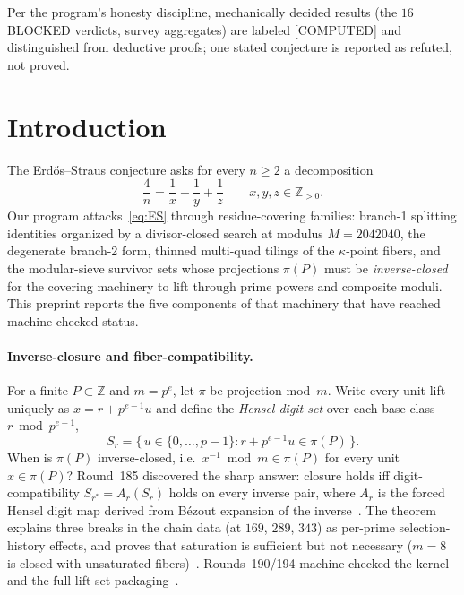 \documentclass[11pt,a4paper]{article}
\theoremstyle{definition}
\begin{document}
Per the program's honesty discipline, mechanically decided results (the
$16$ BLOCKED verdicts, survey aggregates) are labeled [COMPUTED] and
distinguished from deductive proofs; one stated conjecture is reported
as refuted, not proved.

\section{Introduction}

The Erd\H{o}s--Straus conjecture asks for every $n\ge2$ a decomposition
\begin{equation}
  \label{eq:ES}
  \frac{4}{n}=\frac1x+\frac1y+\frac1z\qquad x,y,z\in\mathbb{Z}_{>0}.
\end{equation}
Our program attacks~\eqref{eq:ES} through residue-covering families:
branch-1 splitting identities organized by a divisor-closed search at
modulus $M=2042040$, the degenerate branch-2 form, thinned multi-quad
tilings of the $\kappa$-point fibers, and the modular-sieve survivor
sets whose projections $\pi(P)$ must be \emph{inverse-closed} for the
covering machinery to lift through prime powers and composite moduli.
This preprint reports the five components of that machinery that have
reached machine-checked status.

\paragraph{Inverse-closure and fiber-compatibility.}
For a finite $P\subset\mathbb{Z}$ and $m=p^e$, let $\pi$ be projection
mod~$m$. Write every unit lift uniquely as $x=r+p^{e-1}u$ and define the
\emph{Hensel digit set} over each base class $r\bmod p^{e-1}$,
\begin{equation}
  \label{eq:digset}
  S_r=\{\,u\in\{0,\dots,p-1\}:r+p^{e-1}u\in\pi(P)\,\}.
\end{equation}
When is $\pi(P)$ inverse-closed, i.e.\ $x^{-1}\bmod m\in\pi(P)$ for every
unit $x\in\pi(P)$? Round~185 discovered the sharp answer: closure holds
iff digit-compatibility $S_{r^*}=A_r(S_r)$ holds on every inverse pair,
where $A_r$ is the forced Hensel digit map derived from B\'ezout
expansion of the inverse~\cite{D185}. The theorem explains three breaks
in the chain data (at $169$, $289$, $343$) as per-prime selection-history
effects, and proves that saturation is sufficient but not necessary
($m=8$ is closed with unsaturated fibers)~\cite{D185}. Rounds~190/194
machine-checked the kernel and the full lift-set packaging~\cite{D190,D194}.
\end{document}
